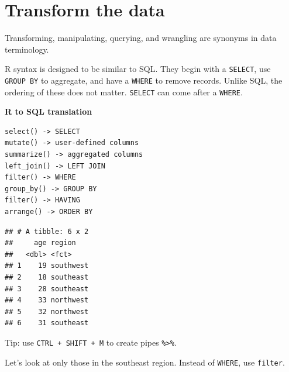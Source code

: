 \documentclass[openany]{book}
\newenvironment{Shaded}{\begin{snugshade}}{\end{snugshade}}
\newcommand{\KeywordTok}[1]{\textcolor[rgb]{0.13,0.29,0.53}{\textbf{#1}}}
\newcommand{\NormalTok}[1]{#1}
\newcommand{\OperatorTok}[1]{\textcolor[rgb]{0.81,0.36,0.00}{\textbf{#1}}}
\newcommand{\StringTok}[1]{\textcolor[rgb]{0.31,0.60,0.02}{#1}}
\begin{document}
\hypertarget{transform-the-data}{%
\section{Transform the data}\label{transform-the-data}}

Transforming, manipulating, querying, and wrangling are synonyms in data terminology.

R syntax is designed to be similar to SQL. They begin with a \texttt{SELECT}, use \texttt{GROUP\ BY} to aggregate, and have a \texttt{WHERE} to remove records. Unlike SQL, the ordering of these does not matter. \texttt{SELECT} can come after a \texttt{WHERE}.

\textbf{R to SQL translation}

\begin{verbatim}
select() -> SELECT
mutate() -> user-defined columns
summarize() -> aggregated columns
left_join() -> LEFT JOIN
filter() -> WHERE
group_by() -> GROUP BY
filter() -> HAVING
arrange() -> ORDER BY
\end{verbatim}

\begin{Shaded}
\end{Shaded}

\begin{verbatim}
## # A tibble: 6 x 2
##     age region   
##   <dbl> <fct>    
## 1    19 southwest
## 2    18 southeast
## 3    28 southeast
## 4    33 northwest
## 5    32 northwest
## 6    31 southeast
\end{verbatim}

Tip: use \texttt{CTRL\ +\ SHIFT\ +\ M} to create pipes \texttt{\%\textgreater{}\%}.

Let's look at only those in the southeast region. Instead of \texttt{WHERE}, use \texttt{filter}.

\begin{Shaded}
\end{Shaded}
\end{document}
